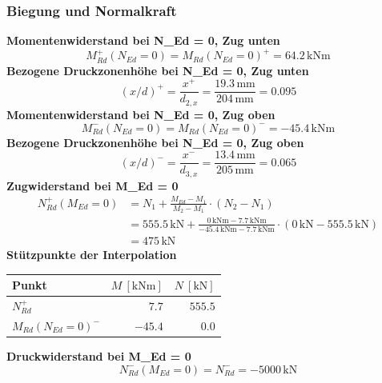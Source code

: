 \documentclass[11pt,a4paper]{article}
\begin{document}
\subsubsection{Biegung und Normalkraft}
\noindent\textbf{Momentenwiderstand bei N\_Ed = 0, Zug unten}
\begin{equation*}
M_{Rd}^{+}(N_{Ed} = 0) = M_{Rd}(N_{Ed}=0)^{+} = 64.2\,\mathrm{kNm}
\end{equation*}
\noindent\textbf{Bezogene Druckzonenhöhe bei N\_Ed = 0, Zug unten}
\begin{equation*}
\left(x/d\right)^{+} = \frac{x^{+}}{d_{2,x}} = \frac{19.3\,\mathrm{mm}}{204\,\mathrm{mm}} = 0.095
\end{equation*}
\noindent\textbf{Momentenwiderstand bei N\_Ed = 0, Zug oben}
\begin{equation*}
M_{Rd}^{-}(N_{Ed} = 0) = M_{Rd}(N_{Ed}=0)^{-} = -45.4\,\mathrm{kNm}
\end{equation*}
\noindent\textbf{Bezogene Druckzonenhöhe bei N\_Ed = 0, Zug oben}
\begin{equation*}
\left(x/d\right)^{-} = \frac{x^{-}}{d_{3,x}} = \frac{13.4\,\mathrm{mm}}{205\,\mathrm{mm}} = 0.065
\end{equation*}
\noindent\textbf{Zugwiderstand bei M\_Ed = 0}
\begin{equation*}
\begin{aligned}
  N_{Rd}^{+}(M_{Ed} = 0) &= N_1 + \frac{M_{Ed} - M_1}{M_2 - M_1} \cdot \left(N_2 - N_1\right) \\
  &= 555.5\,\mathrm{kN} + \frac{0\,\mathrm{kNm} - 7.7\,\mathrm{kNm}}{-45.4\,\mathrm{kNm} - 7.7\,\mathrm{kNm}} \cdot \left(0\,\mathrm{kN} - 555.5\,\mathrm{kN}\right) \\
  &= 475\,\mathrm{kN}
\end{aligned}
\end{equation*}
\noindent\textbf{Stützpunkte der Interpolation}
\begin{longtable}{lrr}
\hline
Punkt & $M\ [\mathrm{kNm}]$ & $N\ [\mathrm{kN}]$ \\
\hline
\endhead
$N_{Rd}^{+}$ & $7.7$ & $555.5$ \\
$M_{Rd}(N_{Ed}=0)^{-}$ & $-45.4$ & $0.0$ \\
\hline
\end{longtable}
\noindent\textbf{Druckwiderstand bei M\_Ed = 0}
\begin{equation*}
N_{Rd}^{-}(M_{Ed} = 0) = N_{Rd}^{-} = -5000\,\mathrm{kN}
\end{equation*}
\end{document}

